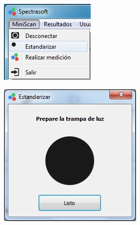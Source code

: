 \begin{figure}[H]
\centering
\begin{subfigure}{.33\textwidth}
  \centering
  \includegraphics[width=.9\linewidth]{./img/estandarizar.jpg}
\end{subfigure}%
\centering
\begin{subfigure}{.33\textwidth}
  \centering
  \includegraphics[width=.9\linewidth]{./img/estandarizar-negro.jpg}
\end{subfigure}%
\begin{subfigure}{.33\textwidth}

\end{subfigure}
\end{figure}

